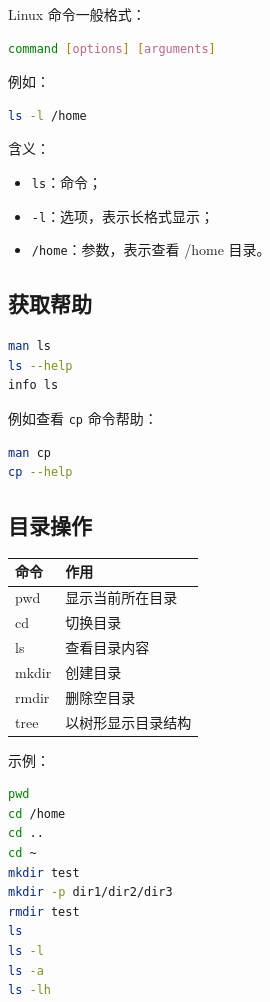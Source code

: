 \documentclass[UTF8,a4paper,12pt]{ctexart}
\begin{document}
Linux 命令一般格式：

\begin{lstlisting}[language=bash]
command [options] [arguments]
\end{lstlisting}

例如：

\begin{lstlisting}[language=bash]
ls -l /home
\end{lstlisting}

含义：
\begin{itemize}
    \item \texttt{ls}：命令；
    \item \texttt{-l}：选项，表示长格式显示；
    \item \texttt{/home}：参数，表示查看 /home 目录。
\end{itemize}

\subsection{获取帮助}

\begin{lstlisting}[language=bash]
man ls
ls --help
info ls
\end{lstlisting}

例如查看 \texttt{cp} 命令帮助：

\begin{lstlisting}[language=bash]
man cp
cp --help
\end{lstlisting}

\subsection{目录操作}

\begin{longtable}{p{4cm}p{10cm}}
\toprule
命令 & 作用 \\
\midrule
pwd & 显示当前所在目录 \\
cd & 切换目录 \\
ls & 查看目录内容 \\
mkdir & 创建目录 \\
rmdir & 删除空目录 \\
tree & 以树形显示目录结构 \\
\bottomrule
\end{longtable}

示例：

\begin{lstlisting}[language=bash]
pwd
cd /home
cd ..
cd ~
mkdir test
mkdir -p dir1/dir2/dir3
rmdir test
ls
ls -l
ls -a
ls -lh
\end{lstlisting}
\end{document}
